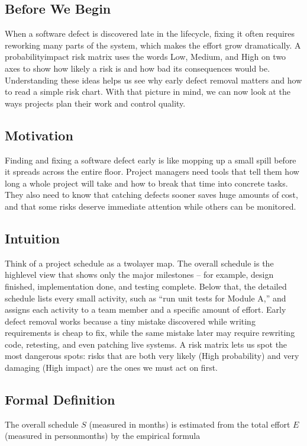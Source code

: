\documentclass[12pt, a4paper]{article}
\begin{document}
\subsection{Before We Begin}
When a software defect is discovered late in the lifecycle, fixing it often requires reworking many parts of the system, which makes the effort grow dramatically.  
A probabilityimpact risk matrix uses the words Low, Medium, and High on two axes to show how likely a risk is and how bad its consequences would be.  
Understanding these ideas helps us see why early defect removal matters and how to read a simple risk chart.  
With that picture in mind, we can now look at the ways projects plan their work and control quality.

\subsection{Motivation}
Finding and fixing a software defect early is like mopping up a small spill before it spreads across the entire floor.  
Project managers need tools that tell them how long a whole project will take and how to break that time into concrete tasks.  
They also need to know that catching defects sooner saves huge amounts of cost, and that some risks deserve immediate attention while others can be monitored.

\subsection{Intuition}
Think of a project schedule as a twolayer map.  
The overall schedule is the highlevel view that shows only the major milestones -- for example, design finished, implementation done, and testing complete.  
Below that, the detailed schedule lists every small activity, such as ``run unit tests for Module A,'' and assigns each activity to a team member and a specific amount of effort.  
Early defect removal works because a tiny mistake discovered while writing requirements is cheap to fix, while the same mistake later may require rewriting code, retesting, and even patching live systems.  
A risk matrix lets us spot the most dangerous spots: risks that are both very likely (High probability) and very damaging (High impact) are the ones we must act on first.

\subsection{Formal Definition}
The overall schedule \(S\) (measured in months) is estimated from the total effort \(E\) (measured in personmonths) by the empirical formula  
\end{document}
